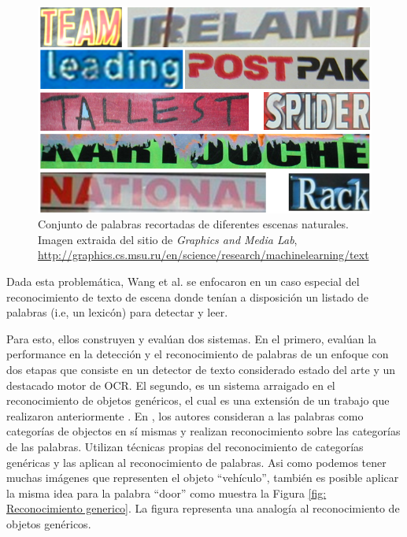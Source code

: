 \begin{itemize}
	\begin{figure}[htbp]
		\centering
		\centerline{ \includegraphics[scale=0.30]{img/cropped_words.png} }
		\caption[Reconocimiento de palabras recortadas]{Conjunto de palabras recortadas de diferentes escenas naturales. Imagen extraida del sitio de \textit{Graphics and Media Lab}, \url{http://graphics.cs.msu.ru/en/science/research/machinelearning/text}}
		\label{fig: Reconocimiento palabras}
	\end{figure}
		
	\end{itemize}

	Dada esta problemática, Wang et al. se enfocaron en un caso especial del reconocimiento de texto de escena donde tenían a disposición un listado de palabras (i.e, un lexicón) para detectar y leer.
		
	Para esto, ellos construyen y evalúan dos sistemas. En el primero, evalúan la performance en la detección y el reconocimiento de palabras de un enfoque con dos etapas que consiste en un detector de texto considerado estado del arte y un destacado motor de OCR. El segundo, es un sistema arraigado en el reconocimiento de objetos genéricos, el cual es una extensión de un trabajo que realizaron anteriormente \cite{WB10}. En \cite{WB10}, los autores consideran a las palabras como categorías de objectos en sí mismas y realizan reconocimiento sobre las categorías de las palabras. Utilizan técnicas propias del reconocimiento de categorías genéricas y las aplican al reconocimiento de palabras. Asi como podemos tener muchas imágenes que representen el objeto ``vehículo'', también es posible aplicar la misma idea para la palabra ``door'' como muestra la Figura \ref{fig: Reconocimiento generico}. La figura representa una analogía al reconocimiento de objetos genéricos.
	
